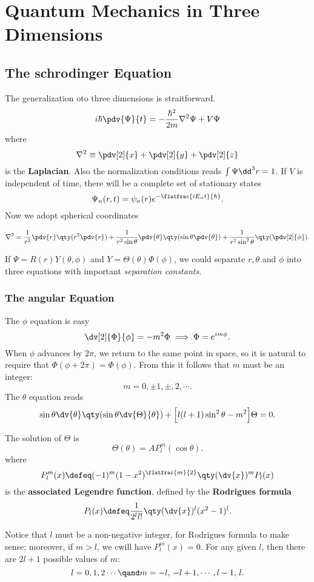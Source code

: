\section{Quantum Mechanics in Three Dimensions}
\subsection{The schrodinger Equation}
The generalization oto three dimensions is straitforward.
\[
	i\hbar\pdv{\Psi}{t}=-\frac{\hbar^2}{2m}\nabla^2\Psi+V\Psi
\] 
where
\[
	\nabla^2\equiv\pdv[2]{x}+\pdv[2]{y}+\pdv[2]{z}
\] 
is the \textbf{Laplacian}. Also the normalization conditions reads $\int\Psi\dd^3\*r=1$.
If  $V$ is independent of time, there will be a complete set of stationary states
 \[
	 \Psi_n(\*r,t)=\psi_n(\*r)e^{-\flatfrac{iE_nt}{\hbar}}
.\] 
Now we adopt spherical coordinates
\begin{lemma}
	\[
		\nabla^2
		=
		\frac{1}{r^2}\pdv{r}\qty(r^2\pdv{r})
		+
		\frac{1}{r^2\sin\theta}\pdv{\theta}\qty(\sin\theta\pdv{\theta})
		+
		\frac{1}{r^2\sin^2\theta}\qty(\pdv[2]{\phi})
	.\] 
\end{lemma}

If $\Psi=R(r)Y(\theta,\phi)$ and $Y=\Theta(\theta)\Phi(\phi)$, we could separate $r,\theta$ and $\phi$ into three equations with important \textit{separation constants}.

\subsubsection{The angular Equation}
The $\phi$ equation is easy
 \[
	 \dv[2]{\Phi}{\phi}=-m^2\Phi \implies \Phi=e^{im\phi}
.\] 
When $\phi$ advances by  $2\pi$, we return to the same point in space, so it is natural to require that  $\Phi(\phi+2\pi)=\Phi(\phi)$. From this it follows that  $m$ must be an integer:
 \[
    m=0,\pm 1,\pm, 2,\cdots
.\] 
The $\theta$ equation reads
 \[
	 \sin\theta\dv{\theta}\qty(\sin\theta\dv{\Theta}{\theta})
	 +
	 \Big[l(l+1)\sin^2\theta-m^2\Big]\Theta
	 =
	 0
.\] 
\begin{lemma}
	The solution of $\Theta$ is
	\[
	    \Theta(\theta)=AP^m_l(\cos\theta)
	.\] 
	where
	\[
	    P^m_l(x)
		\defeq
		(-1)^m(1-x^2)^{\flatfrac{m}{2}}\qty(\dv{x})^m P_l(x)
	\] 
	is the \textbf{associated Legendre function}, defined by the \textbf{Rodrigues formula}
	\[
	    P_l(x)
		\defeq
		\frac{1}{2^l l!}\qty(\dv{x})^l(x^2-1)^l
	.\] 
\end{lemma}
\begin{remark}
	Notice that $l$ must be a non-negative integer, for Rodrigues formula to make sense; moreover, if  $m>l$, we cwill have  $P^m_l(x)=0$. For any given  $l$, then there are  $2l+1$ possible values of  $m$:
	\[
		l=0,1,2\cdots \qand m=-l,\,-l+1,\cdots,l-1,\,l
	.\] 
\end{remark}

